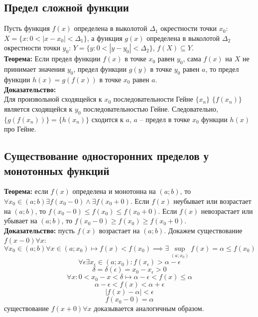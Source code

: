 \documentclass{article}
\begin{document}
    \subsection*{Предел сложной функции}
        Пусть функция $f(x)$ определена в выколотой $\Delta_1$ окрестности точки $x_0$: $X = \{x: 0 < |x - x_0| < \Delta_1\}$,
        а функция $g(x)$ определена в выколотой $\Delta_2$ окрестности точки $y_0$: $Y = \{y: 0 < |y - y_0| < \Delta_2\}$,
        $f(X) \subseteq Y$.
        \\
        \textbf{Теорема:} Если предел функции $f(x)$ в точке $x_0$ равен $y_0$, сама $f(x)$ на $X$ не принимает значения $y_0$, предел функции $g(y)$ в точке $y_0$ равен $a$,
        то предел функции $h(x) = g(f(x))$ в точке $x_0$ равен $a$.
        \\
        \textbf{Доказательство:}
        \\
        Для произвольной сходящейся к $x_0$ последовательности Гейне $\{x_n\}$ $\{f(x_n)\}$ является сходящейся к $y_0$ последовательностью Гейне.
        Следовательно, $\{g(f(x_n))\} = \{h(x_n)\}$ сходится к $a$, $a$ -- предел в точке $x_0$ функции $h(x)$ про Гейне.
    
    
    \subsection*{Существование односторонних пределов у монотонных функций}
        \textbf{Теорема:} если $f(x)$ определена и монотонна на $(a;b)$, то $ \forall x_0 \in (a;b) \exists f(x_0 - 0) \wedge \exists f(x_0 + 0)$.
        Если $f(x)$ неубывает или возрастает на $(a;b)$, то $f(x_0 - 0) \le f(x_0) \le f(x_0 + 0)$.
        Если $f(x)$ невозрастает или убывает на $(a;b)$, то $f(x_0 - 0) \ge f(x_0) \ge f(x_0 + 0)$.
        \\
        \textbf{Доказательство:} пусть $f(x)$ возрастает на $(a;b)$.
        Докажем существование $f(x - 0) \forall x$:
        \[ \forall x_0 \in (a;b) \forall x \in (a;x_0) \longmapsto f(x) < f(x_0) \implies \exists \sup_{(a;x_0)} f(x) = \alpha \le f(x_0)\]
        \[ \forall \epsilon \exists x_\epsilon \in (a;x_0): f(x_\epsilon) > \alpha - \epsilon \]
        \[ \delta = \delta(\epsilon) = x_0 - x_\epsilon > 0 \]
        \[ \forall x: 0 < x_0 - x < \delta \longmapsto \alpha - \epsilon < f(x) \le \alpha\]
        \[ \alpha - \epsilon < f(x) < \alpha + \epsilon \]
        \[ |f(x) - \alpha| < \epsilon \]
        \[ f(x_0 - 0) = \alpha \]
        существование $f(x + 0) \forall x$ доказывается аналогичным образом.
\end{document}

